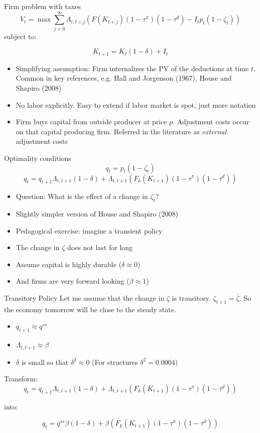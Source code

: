 \documentclass[11pt,aspectratio=169,xcolor={dvipsnames},hyperref={pdftex,pdfpagemode=UseNone,hidelinks,pdfdisplaydoctitle=true},usepdftitle=false]{beamer}
\begin{document}
\begin{frame}{Firm problem with taxes}
\[V_t = \max \sum_{j = 0}^{\infty}\Lambda_{t,t+j} \left( F(K_{t+j})(1-\tau^{\pi})(1-\tau^d) - I_t p_t (1-\zeta_t) \right)\]
subject to:

\[K_{t+1} = K_t(1-\delta) + I_t \]
\begin{itemize}
\item Simplifying assumption: Firm internalizes the PV of the deductions at time $t$. Common in key references, e.g. Hall and Jorgenson (1967), House and Shapiro (2008)
\item No labor explicitly. Easy to extend if labor market is spot, just more notation
\item Firm buys capital from outside producer at price $p$. Adjustment costs occur on that capital producing firm. Referred in the literature as \textit{external} adjustment costs
\end{itemize}
\end{frame}

\begin{frame}{Optimality conditions}
\[ q_t =  p_t (1-\zeta_t) \]
\[q_t = q_{t+1} \Lambda_{t,t+1} (1-\delta)  + \Lambda_{t,t+1} \left(F_k(K_{t+1})(1-\tau^{\pi})(1-\tau^d)  \right) \]
\begin{itemize}
\item Question: What is the effect of a change in $\zeta_t$?
\item Slightly simpler version of House and Shapiro (2008)
\item Pedagogical exercise: imagine a transient policy
\item The change in $\zeta$ does not last for long
\item Assume capital is highly durable ($\delta \approx 0$)
\item And firms are very forward looking ($\beta \approx 1$)
\end{itemize}
\end{frame}

\begin{frame}{Transitory Policy}
Let me assume that the change in $\zeta$ is transitory. $\zeta_{t+1} = \bar{\zeta}$. So the economy tomorrow will be close to the steady state.
\begin{itemize}
\item   $q_{t+1} \approx q^{ss}$
\item $\Lambda_{t,t+1} \approx \beta$
\item $\delta$ is small so that $\delta^2 \approx 0$ (For structures $\delta^2 = 0.0004$)
\end{itemize}
Transform:
\[q_t = q_{t+1} \Lambda_{t,t+1} (1-\delta)  + \Lambda_{t,t+1} \left(F_k(K_{t+1})(1-\tau^{\pi})(1-\tau^d)  \right) \]

into:

\[q_t = q^{ss} \beta (1-\delta)  + \beta \left(F_k(K_{t+1})(1-\tau^{\pi})(1-\tau^d) \right) \]

\end{frame}
\end{document}
